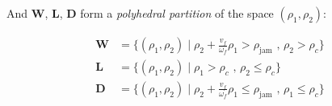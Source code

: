 \noindent And \textbf{W}, \textbf{L}, \textbf{D} form a \textit{polyhedral partition} of the space $(\rho_{1},\rho_{2})$:

\begin{equation}
\begin{array}{ll}
\textbf{W} & = \{(\rho_{1},\rho_{2}) \mid \rho_{2} + \frac{v_{f}}{\omega_{f}}\rho_{1} > \rho_{\text{jam}} \text{ ,   } \rho_{2} > \rho_{c}\}\\
\textbf{L} & = \{(\rho_{1},\rho_{2}) \mid \rho_{1} > \rho_{c} \text{ ,   } \rho_{2} \leq \rho_{c}\}\\
\textbf{D} & = \{(\rho_{1},\rho_{2}) \mid \rho_{2} + \frac{v_{f}}{\omega_{f}}\rho_{1} \leq \rho_{\text{jam}} \text{ ,   } \rho_{1} \leq \rho_{c}\}\end{array}
\label{eq:regions2}
\end{equation}